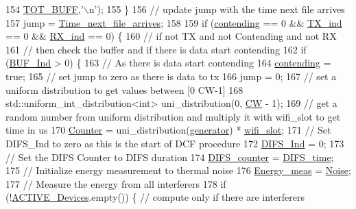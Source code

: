 \begin{DoxyCode}
154         \hyperlink{classSTA_aea9dd38428aa0d91147434e67ade8dad}{TOT\_BUFF},\textcolor{charliteral}{'\(\backslash\)n'});
155     \}
156     \textcolor{comment}{// update jump with the time next file arrives      }
157     jump = \hyperlink{classSTA_ad7653686912b61e311486017049c3612}{Time\_next\_file\_arrives};
158 
159     \textcolor{keywordflow}{if} (\hyperlink{classSTA_ad4226c80ad37062f9648438bce828089}{contending} == 0 && \hyperlink{classSTA_a0ad8be1dec7b752e1be4f13e03faae4c}{TX\_ind} == 0 && \hyperlink{classSTA_aace6d664e5ecf495177277ef030141c6}{RX\_ind} == 0) \{
160         \textcolor{comment}{// if not TX and not Contending and not RX}
161         \textcolor{comment}{// then check the buffer and if there is data start contending}
162         \textcolor{keywordflow}{if} (\hyperlink{classSTA_a1ca62aa52da9e93aacdf3aa8886966c2}{BUF\_Ind} > 0) \{
163             \textcolor{comment}{// As there is data start contending}
164             \hyperlink{classSTA_ad4226c80ad37062f9648438bce828089}{contending} = \textcolor{keyword}{true};
165             \textcolor{comment}{// set jump to zero as there is data to tx}
166             jump = 0;
167             \textcolor{comment}{// set a uniform distribution to get values between [0 CW-1]}
168             std::uniform\_int\_distribution<int> uni\_distribution(0, \hyperlink{classSTA_add0683c8927abd74b422d88844a00602}{CW} - 1);
169             \textcolor{comment}{// get a random number from uniform distribution and multiply it with wifi\_slot to get time in
       us}
170             \hyperlink{classSTA_ac8a769972c9e523e988f60c75254d215}{Counter} = uni\_distribution(\hyperlink{classSTA_a6abca7e07713d8123e843efea3c87cd1}{generator}) * \hyperlink{classSTA_a376c698ac01f5368b7e218609caa1a5a}{wifi\_slot};
171             \textcolor{comment}{// Set DIFS\_Ind to zero as this is the start of DCF procedure}
172             \hyperlink{classSTA_a4afbf4650f847e15efbacec896f73f73}{DIFS\_Ind} = 0;
173             \textcolor{comment}{// Set the DIFS Counter to DIFS duration}
174             \hyperlink{classSTA_a94200f37027c90163adc2cee2c502a90}{DIFS\_counter} = \hyperlink{classSTA_a156a07b07e16882d60b93571b8e3cd21}{DIFS\_time};
175             \textcolor{comment}{// Initialize energy measurement to thermal noise}
176             \hyperlink{classSTA_a3d52251caf1e4b973bf795dcf8c2fafa}{Energy\_meas} = \hyperlink{classSTA_ae9a319d9b58f28610defc9e0fc51aa60}{Noise};
177             \textcolor{comment}{// Measure the energy from all interferers}
178             \textcolor{keywordflow}{if} (!\hyperlink{classSTA_a536179d10f961ae6f7330b980a13668e}{ACTIVE\_Devices}.empty()) \{ \textcolor{comment}{// compute only if there are interferers}

\end{DoxyCode}
